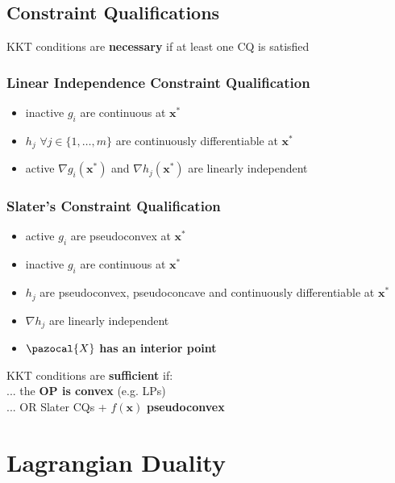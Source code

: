 \documentclass[english]{latex4ei/latex4ei_sheet}
\begin{document}
\begin{sectionbox}
	\subsection{Constraint Qualifications}
	KKT conditions are \textbf{necessary} if at least one CQ is satisfied
	\subsubsection{Linear Independence Constraint Qualification}
	\vspace{0.3em}
	\begin{itemize}
		\item inactive $g_i$ are continuous at $\bm{x}^*$
		\item $h_j$ $\forall j \in \{1, \dots, m\}$ are continuously differentiable at $\bm{x}^*$
		\item active $\nabla g_i(\bm{x}^*)$ and $\nabla h_j(\bm{x}^*)$ are linearly independent
	\end{itemize}
	\vspace{1em}
	\subsubsection{Slater's Constraint Qualification}
	\vspace{0.3em}
	\begin{itemize}
		\item active $g_i$ are pseudoconvex at $\bm{x}^*$
		\item inactive $g_i$ are continuous at $\bm{x}^*$
		\item $h_j$ are pseudoconvex, pseudoconcave and continuously differentiable at $\bm{x}^*$
		\item $\nabla h_j$ are linearly independent
		\item $\pazocal{X}$ \textbf{has an interior point}
	\end{itemize}
	\vspace{0.5em}
	KKT conditions are \textbf{sufficient} if: \\
	... the \textbf{OP is convex} (e.g. LPs) \\
	... OR Slater CQs + $f(\bm{x})$ \textbf{pseudoconvex}
\end{sectionbox}

\section{Lagrangian Duality}
\end{document}
